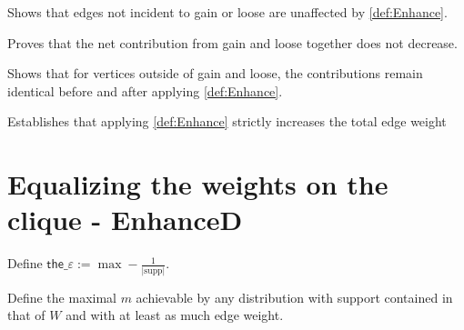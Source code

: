\begin{lemma}
  \label{lem:Enhance_sum_complement_unchanged}
  \leanok
  Shows that edges not incident to gain or loose are unaffected by \ref{def:Enhance}.
\end{lemma}

\begin{lemma}
  \label{lem:Enhance_edge_gainloose_increase}
  \leanok
  Proves that the net contribution from gain and loose together does not decrease.
\end{lemma}

\begin{lemma}
  \label{lem:Enhance_support_edges_same}
  \leanok
  Shows that for vertices outside of gain and loose, the contributions remain identical
  before and after applying \ref{def:Enhance}.
\end{lemma}

\begin{theorem}
  \label{thm:Enhance_total_weight_stricinc}
  \leanok
  Establishes that applying \ref{def:Enhance} strictly increases the total
  edge weight
\end{theorem}

\section{Equalizing the weights on the clique - EnhanceD}

\begin{definition}
  \label{def:the_e}
  \leanok
  Define $\displaystyle \mathsf{the\_\varepsilon} := \max - \frac{1}{|\mathrm{supp}|}$.
\end{definition}

\begin{definition}
  \label{def:max_uniform_support}
  \leanok
  Define the maximal $m$ achievable by any distribution with support contained in that of $W$
  and with at least as much edge weight.
\end{definition}

